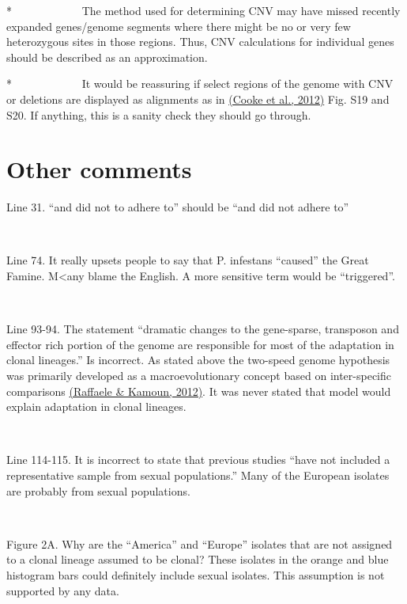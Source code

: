 \documentclass[10pt]{article}
\begin{document}
\par\null

*~~~~~~~~~~~~ The method used for determining CNV may have missed
recently expanded genes/genome segments where there might be no or very
few heterozygous sites in those regions. Thus, CNV calculations for
individual genes should be described as an approximation.

\par\null

*~~~~~~~~~~~~ It would be reassuring if select regions of the genome
with CNV or deletions are displayed as alignments as in
\hyperref[csl:3]{(Cooke et al., 2012)} Fig. S19 and S20. If anything, this is a sanity
check they should go through.

\par\null

\section*{Other comments}

{\label{405507}}

Line 31. ``and did not to adhere to'' should be ``and did not adhere
to''

~

Line 74. It really upsets people to say that P. infestans ``caused'' the
Great Famine. M\textless{}any blame the English. A more sensitive term
would be ``triggered''.

~

Line 93-94. The statement ``dramatic changes to the gene-sparse,
transposon and effector rich portion of the genome are responsible for
most of the adaptation in clonal lineages.'' Is incorrect. As stated
above the two-speed genome hypothesis was primarily developed as a
macroevolutionary concept based on inter-specific comparisons
\hyperref[csl:7]{(Raffaele \& Kamoun, 2012)}. It was never stated that model would explain
adaptation in clonal lineages.

~

Line 114-115. It is incorrect to state that previous studies ``have not
included a representative sample from sexual populations.'' Many of the
European isolates are probably from sexual populations.

~

Figure 2A. Why are the ``America'' and ``Europe'' isolates that are not
assigned to a clonal lineage assumed to be clonal? These isolates in the
orange and blue histogram bars could definitely include sexual isolates.
This assumption is not supported by any data.
\end{document}
